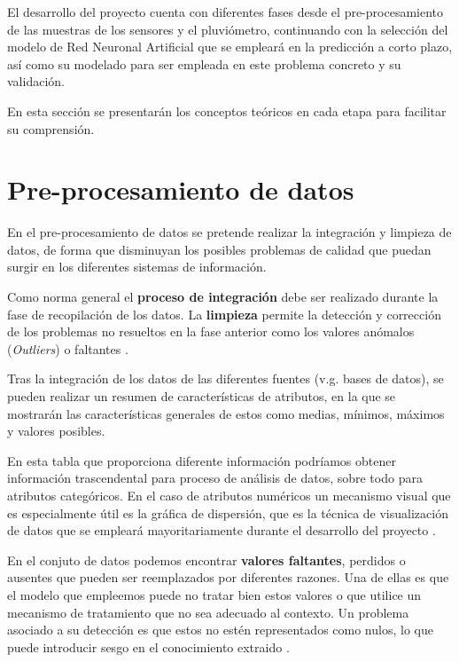 El desarrollo del proyecto cuenta con diferentes fases desde el pre-procesamiento de las muestras de los sensores y el pluviómetro,
continuando con la selección del modelo de Red Neuronal Artificial que se empleará en la predicción a corto plazo, así como su 
modelado para ser empleada en este problema concreto y su validación.


En esta sección se presentarán los conceptos teóricos en cada etapa para facilitar su comprensión.

\section{Pre-procesamiento de datos}
En el pre-procesamiento de datos se pretende realizar la integración y limpieza de datos, de forma que disminuyan los posibles problemas
de calidad que puedan surgir en los diferentes sistemas de información.

Como norma general el \textbf{proceso de integración} debe ser realizado durante la fase de recopilación de los datos.
La \textbf{limpieza} permite la detección y corrección de los problemas no resueltos en la fase anterior como los valores anómalos (\textit{Outliers}) o faltantes 
\cite{book:hernandez2004}.  

Tras la integración de los datos de las diferentes fuentes (v.g. bases de datos), se pueden realizar un resumen de características de atributos, en la que
se mostrarán las características generales de estos como medias, mínimos, máximos y valores posibles. 

En esta tabla que proporciona diferente información podríamos obtener información trascendental para proceso de análisis de datos, sobre todo para atributos categóricos.
En el caso de atributos numéricos un mecanismo visual que es especialmente útil es la gráfica de dispersión, que es la técnica de visualización
de datos que se empleará mayoritariamente durante el desarrollo del proyecto \cite{book:hernandez2004}.

En el conjuto de datos podemos encontrar \textbf{valores faltantes}, perdidos o ausentes que pueden ser reemplazados por diferentes razones. Una de ellas es que
el modelo que empleemos puede no tratar bien estos valores o que utilice un mecanismo de tratamiento que no sea adecuado al contexto.
Un problema asociado a su detección es que estos no estén representados como nulos, lo que puede introducir sesgo en el conocimiento
extraido \cite{book:hernandez2004}.

